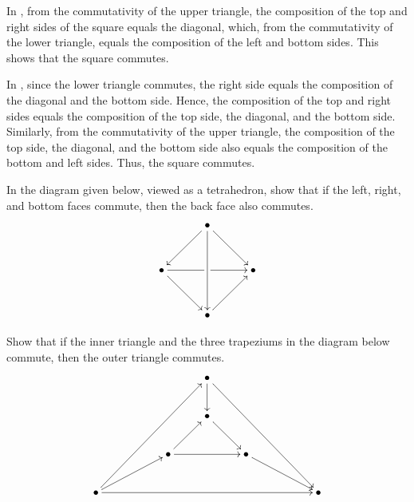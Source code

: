 \begin{Solution*}
In , from the commutativity of the upper triangle, the composition of the top and right sides of the square equals the diagonal, which, from the commutativity of the lower triangle, equals the composition of the left and bottom sides. This shows that the square commutes.

In , since the lower triangle commutes, the right side equals the composition of the diagonal and the bottom side. Hence, the composition of the top and right sides equals the composition of the top side, the diagonal, and the bottom side. Similarly, from the commutativity of the upper triangle, the composition of the top side, the diagonal, and the bottom side also equals the composition of the bottom and left sides. Thus, the square commutes.
\end{Solution*}


\begin{Exercise}
In the diagram given below, viewed as a tetrahedron, show that if the left, right, and bottom faces commute, then the back face also commutes.
\begin{equation*}
\xymatrix@=3em{
& \bullet \ar[ld] \ar[dd] \ar[rd] & \\
\bullet \ar[rd] \ar[rr]|\hole & & \bullet \\
& \bullet \ar[ru] &
}
\end{equation*}
\end{Exercise}

\begin{Exercise}
Show that if the inner triangle and the three trapeziums in the diagram below commute, then the outer triangle commutes.
\begin{equation*}
\xymatrix{
&&& \bullet \ar[d] \ar[rrrddd] &&& \\
&&& \bullet \ar[rd] &&& \\
&& \bullet \ar[ur] \ar[rr] && \bullet \ar[rrd] && \\
\bullet \ar[rrruuu] \ar[rru] \ar[rrrrrr] &&&&&& \bullet
}
\end{equation*}
\end{Exercise}

